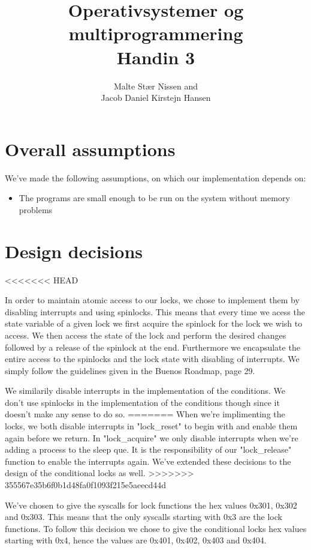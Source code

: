\documentclass[11pt,a4paper]{article}
\title{Operativsystemer og multiprogrammering \\ Handin 3}
\author{Malte Stær Nissen and \\ 
        Jacob Daniel Kirstejn Hansen}
\begin{document}
\maketitle

\tableofcontents
\newpage

\section{Overall assumptions}
We've made the following assumptions, on which our implementation depends on: 

\begin{itemize}
\item The programs are small enough to be run on the system without memory problems
\end{itemize}

\section{Design decisions}
<<<<<<< HEAD

In order to maintain atomic access to our locks, we chose to implement them by disabling interrupts and using spinlocks. This means that every time we acess the state variable of a given lock we first acquire the spinlock for the lock we wish to access. We then access the state of the lock and perform the desired changes followed by a release of the spinlock at the end. Furthermore we encapsulate the entire access to the spinlocks and the lock state with disabling of interrupts. We simply follow the guidelines given in the Buenos Roadmap, page 29.

We similarily disable interrupts in the implementation of the conditions. We don't use spinlocks in the implementation of the conditions though since it doesn't make any sense to do so.
=======
When we're implimenting the locks, we both disable interrupts in "lock\_reset"
to begin with and enable them again before we return. In "lock\_acquire" we
only disable interrupts when we're adding a process to the sleep que. It is the
responsibility of our "lock\_release" function to enable the interrupts again.
We've extended these decisions to the design of the conditional locks as well.
>>>>>>> 355567e35b6f0b1d48fa0f1093f215e5aeecd44d

We've chosen to give the syscalls for lock functions the hex values 0x301,
0x302 and 0x303. This means that the only syscalls starting with 0x3 are the
lock functions. To follow this decision we chose to give the conditional locks
hex values starting with 0x4, hence the values are 0x401, 0x402, 0x403 and
0x404.
\end{document}
